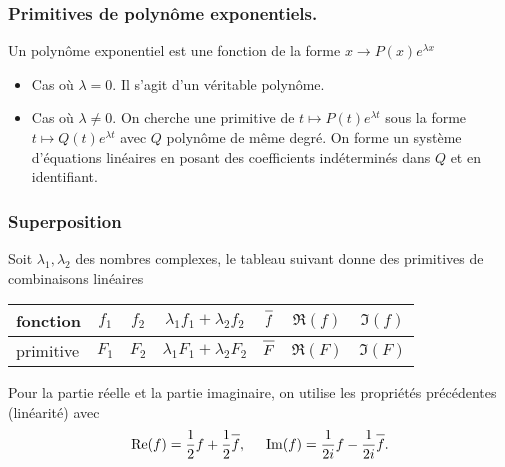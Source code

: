 \subsubsection{Primitives de polynôme exponentiels.}
Un polynôme exponentiel est une fonction de la forme $x\rightarrow P(x)e^{\lambda x}$ 
\begin{itemize}
  \item Cas où $\lambda =0$. Il s'agit d'un véritable polynôme.
  \item Cas où $\lambda \neq 0$. On cherche une primitive de $t\mapsto P(t)e^{\lambda t}$ sous la forme $t\mapsto Q(t)e^{\lambda t}$ avec $Q$ polynôme de même degré. On forme un système d'équations linéaires en posant des coefficients indéterminés dans $Q$ et en identifiant.
\end{itemize}

\subsubsection{Superposition}
Soit $\lambda_1, \lambda_2$ des nombres complexes, le tableau suivant donne des primitives de combinaisons linéaires
\begin{center}
\renewcommand{\arraystretch}{1.5}
\begin{tabular}{|l|c|c|c|c|c|c|} \hline
fonction  & $f_1$ & $f_2$ & $\lambda_1 f_1 + \lambda_2 f_2$ & $\overline{f \strut}$ & $\Re(f)$ & $\Im(f)$ \\ \hline
primitive & $F_1$ & $F_2$ & $\lambda_1 F_1 + \lambda_2 F_2$ & $\overline{F\strut}$ & $\Re(F)$ & $\Im(F)$ \\ \hline
\end{tabular}
\end{center}
Pour la partie réelle et la partie imaginaire, on utilise les propriétés précédentes (linéarité) avec
\[
 \Re(f) = \frac{1}{2}f +  \frac{1}{2}\overline{f \strut} , \hspace{0.5cm} \Im(f) = \frac{1}{2i}f -  \frac{1}{2i}\overline{f \strut}.
\]

